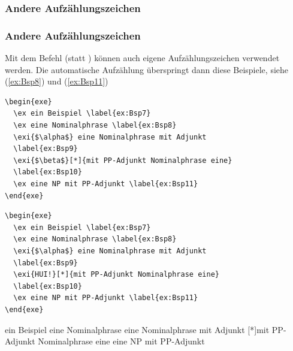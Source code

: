 \subsubsection{Andere Aufzählungszeichen}

\begin{frame}[fragile]
\frametitle{Andere Aufzählungszeichen}

Mit dem Befehl  (statt ) können auch eigene Aufzählungszeichen verwendet werden. Die automatische Aufzählung überspringt dann diese Beispiele, siehe (\ref{ex:Bsp8}) und (\ref{ex:Bsp11})

\begin{lstlisting}
\begin{exe}
  \ex ein Beispiel \label{ex:Bsp7}
  \ex eine Nominalphrase \label{ex:Bsp8}
  \exi{$\alpha$} eine Nominalphrase mit Adjunkt 
  \label{ex:Bsp9}
  \exi{$\beta$}[*]{mit PP-Adjunkt Nominalphrase eine} 
  \label{ex:Bsp10}
  \ex eine NP mit PP-Adjunkt \label{ex:Bsp11}
\end{exe}

\end{lstlisting}


\end{frame}



\begin{frame}[fragile]


\begin{lstlisting}
\begin{exe}
  \ex ein Beispiel \label{ex:Bsp7}
  \ex eine Nominalphrase \label{ex:Bsp8}
  \exi{$\alpha$} eine Nominalphrase mit Adjunkt 
  \label{ex:Bsp9}
  \exi{HUI!}[*]{mit PP-Adjunkt Nominalphrase eine} 
  \label{ex:Bsp10}
  \ex eine NP mit PP-Adjunkt \label{ex:Bsp11}
\end{exe}

\end{lstlisting}

\begin{exe}
	\ex ein Beispiel \label{ex:Bsp7}
	\ex eine Nominalphrase \label{ex:Bsp8}
	\exi{$\alpha$} eine Nominalphrase mit Adjunkt \label{ex:Bsp9}
	{mit PP-Adjunkt Nominalphrase eine} \label{ex:Bsp10}
	\ex eine NP mit PP-Adjunkt \label{ex:Bsp11}
\end{exe}


\end{frame}


